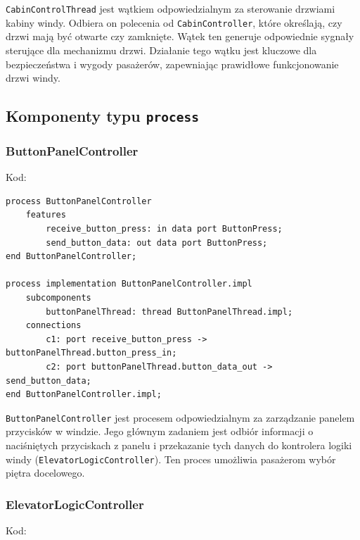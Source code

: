 \documentclass{article}
\begin{document}
    \texttt{CabinControlThread} jest wątkiem odpowiedzialnym za sterowanie drzwiami kabiny windy. Odbiera on polecenia od \texttt{CabinController}, które określają, czy drzwi mają być otwarte czy zamknięte. Wątek ten generuje odpowiednie sygnały sterujące dla mechanizmu drzwi. Działanie tego wątku jest kluczowe dla bezpieczeństwa i wygody pasażerów, zapewniając prawidłowe funkcjonowanie drzwi windy.






    \subsection{Komponenty typu \texttt{process}}

    
    \subsubsection{ButtonPanelController}

    Kod:
    
    \begin{lstlisting}[basicstyle=\ttfamily, keywordstyle=\bfseries]
process ButtonPanelController
    features
        receive_button_press: in data port ButtonPress;
        send_button_data: out data port ButtonPress;
end ButtonPanelController;

process implementation ButtonPanelController.impl
    subcomponents
        buttonPanelThread: thread ButtonPanelThread.impl;
    connections
        c1: port receive_button_press -> buttonPanelThread.button_press_in;
        c2: port buttonPanelThread.button_data_out -> send_button_data;
end ButtonPanelController.impl;
    \end{lstlisting}

    \texttt{ButtonPanelController} jest procesem odpowiedzialnym za zarządzanie panelem przycisków w windzie. Jego głównym zadaniem jest odbiór informacji o naciśniętych przyciskach z panelu i przekazanie tych danych do kontrolera logiki windy (\texttt{ElevatorLogicController}). Ten proces umożliwia pasażerom wybór piętra docelowego.





    \subsubsection{ElevatorLogicController}

    Kod:
    
\end{document}
